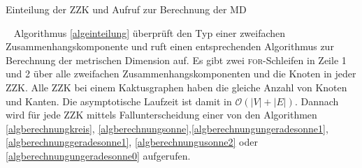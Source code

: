\begin{algorithm}
\caption{Einteilung der ZZK und Aufruf zur Berechnung der MD}
\begin{algorithmic}[1]
\FORALL{($x \in ZZK$%
)}{
\FORALL{($v \in x$)}{ 
\STATE Erhöhe $K[x]$ um eins für jeden Knoten $v$ mit $Klasse[v]=0$ oder $Klasse[v]=A$;
\STATE Erhöhe $S[x]$ um eins für jeden Knoten $v$ mit $Klasse[v]\neq 0$;
\STATE Erhöhe $Anker[x]$ um eins für jeden Knoten $v$ mit $Klasse[v]=A$;
}\ENDFOR
\IF{($x.Knoten==S[x]$)}{\STATE $S(x)$;}\ELSIF{($x.Knoten==K[x]$)}{\STATE $K(x)$;}\ELSE{\IF{($Anker[x] \leq 2$ oder $Anker[x] \geq \frac{n}{2}$)}{
		\IF{($(n\; \textbf{mod} \; 2)==1$ oder $n==4$)}
		{		 \STATE $USU(x)$;
			}
		\ELSIF{($(n\; \textbf{mod} \; 2)==0$)}{
		\IF{($Anker[x]==0$)}{\STATE $USG0(x)$;}
			\ELSE{\STATE $USG1(x)$;}
			\ENDIF
		}\ENDIF}
	\ELSE{\STATE $US(x)$;
	}\ENDIF}\ENDIF
}\ENDFOR
\vspace{2mm}
\end{algorithmic}
\label{algeinteilung}
\end{algorithm}
\vspace{-2mm}
~\linebreak
Algorithmus \ref{algeinteilung} überprüft den Typ einer zweifachen Zusammenhangskomponente und ruft einen entsprechenden Algorithmus zur Berechnung der metrischen Dimension auf. Es gibt zwei \textsc{for}-Schleifen in Zeile 1 und 2 über alle zweifachen Zusammenhangskomponenten und die Knoten in jeder ZZK. 
Alle ZZK bei einem Kaktusgraphen haben die gleiche Anzahl von Knoten und Kanten. Die asymptotische Laufzeit ist damit in $\mathcal{O}(|V|+|E|)$. Dannach wird für jede ZZK mittels Fallunterscheidung einer von den Algorithmen \ref{algberechnungkreis}, \ref{algberechnungsonne},\ref{algberechnungungeradesonne1}, \ref{algberechnunggeradesonne1}, \ref{algberechnungusonne2} oder \ref{algberechnungungeradesonne0} aufgerufen.
\newpage

